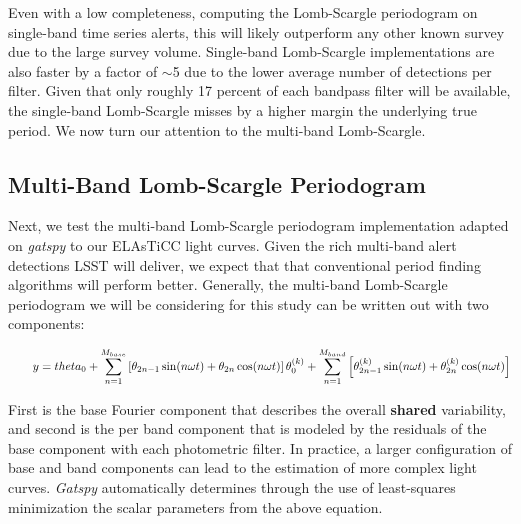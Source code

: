 \documentclass[DM,authoryear,toc]{lsstdoc}
\begin{document}
Even with a low completeness, computing the Lomb-Scargle periodogram on single-band time series alerts, this will likely outperform any other known survey due to the large survey volume. Single-band Lomb-Scargle implementations are also faster by a factor of $\sim$5 due to the lower average number of detections per filter. Given that only roughly 17 percent of each bandpass filter will be available, the single-band Lomb-Scargle misses by a higher margin the underlying true period. We now turn our attention to the multi-band Lomb-Scargle.

\subsection{Multi-Band Lomb-Scargle Periodogram}

Next, we test the multi-band Lomb-Scargle periodogram implementation adapted on \textit{gatspy} to our ELAsTiCC light curves. Given the rich multi-band alert detections LSST will deliver, we expect that that conventional period finding algorithms will perform better. Generally, the multi-band Lomb-Scargle periodogram we will be considering for this study can be written out with two components: 

\begin{equation}
\qquad y = theta_0+\sum_{n=1}^{M_{base}}\left[\theta_{2 n-1} \sin (n \omega t)+\theta_{2 n} \cos (n \omega t)\right] \\
\theta_0^{(k)}+\sum_{n=1}^{M _{band}}\left[\theta_{2 n-1}^{(k)} \sin (n \omega t)+\theta_{2 n}^{(k)} \cos (n \omega t)\right]
\end{equation}

First is the base Fourier component that describes the overall \textbf{shared} variability, and second is the per band component that is modeled by the residuals of the base component with each photometric filter. In practice, a larger configuration of base and band components can lead to the estimation of more complex light curves. \textit{Gatspy} automatically determines through the use of least-squares minimization the scalar parameters from the above equation. 
\end{document}
